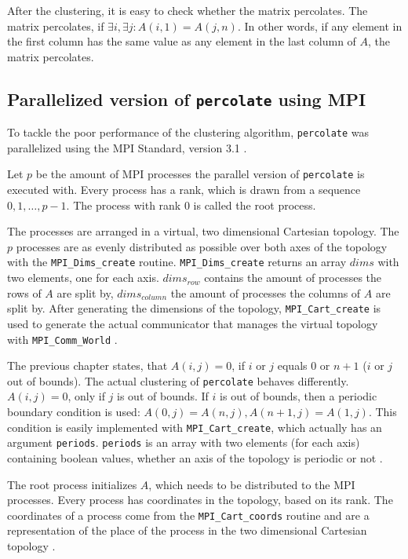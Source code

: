 \documentclass[twoside,11pt]{article}
\def\perc{\texttt{perco\-late}}
\begin{document}
After the clustering, it is easy to check whether the
matrix percolates.
The matrix percolates, if $\exists i, \exists j: A(i,1) =
A(j,n)$.
In other words, if any element in the first column has the
same value as any element in the last column of $A$, the
matrix percolates.



\subsection{Parallelized version of \perc{} using MPI}

To tackle the poor performance of the clustering algorithm,
\perc{} was parallelized using the MPI Standard,
version 3.1 \citep[see][]{mpi}.

Let $p$ be the amount of MPI processes the parallel version
of \perc{} is executed with.
Every process has a rank, which is drawn from a sequence
$0,1,\dots,p-1$.
The process with rank 0 is called the root process.

The processes are arranged in a virtual, two dimensional
Cartesian topology.
The $p$ processes are as evenly distributed as possible
over both axes of the topology with the
\texttt{MPI\_Dims\_create} routine.
\texttt{MPI\_Dims\_create} returns an array $dims$ with two
elements, one for each axis.
$dims_{row}$ contains the amount of processes the rows of
$A$ are split by, $dims_{column}$ the amount of processes
the columns of $A$ are split by.
After generating the dimensions of the topology,
\texttt{MPI\_Cart\_create} is used to generate the actual
communicator that manages the virtual topology with
\texttt{MPI\_Comm\_World} \citep[see][Chapter 7]{mpi}.

The previous chapter states, that $A(i, j) = 0$, if $i$ or
$j$ equals $0$ or $n + 1$ ($i$ or $j$ out of bounds).
The actual clustering of \perc{} behaves differently.
$A(i, j) = 0$, only if $j$ is out of bounds.
If $i$ is out of bounds, then a periodic boundary condition
is used: $A(0, j) = A(n, j), A(n + 1, j) = A(1, j)$.
This condition is easily implemented with
\texttt{MPI\_Cart\_create}, which actually has an argument
\texttt{periods}. \texttt{periods} is an array with two
elements (for each axis) containing boolean values, whether
an axis of the topology is periodic or not
\citep[see][Chapter 7]{mpi}.

The root process initializes $A$, which needs to be
distributed to the MPI processes.
Every process has coordinates in the topology, based on
its rank.
The coordinates of a process come from the
\texttt{MPI\_Cart\_coords} routine and are a representation
of the place of the process in the two dimensional
Cartesian topology \citep[see][Chapter 7]{mpi}.
\end{document}
